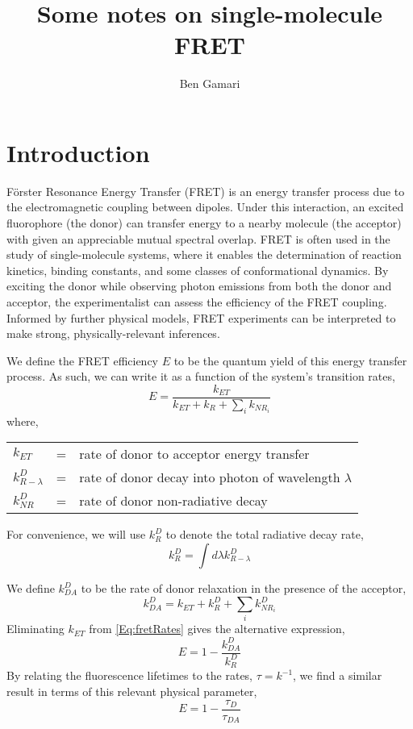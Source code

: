 \documentclass{article}
\title{Some notes on single-molecule FRET}
\author{Ben Gamari}
\newcommand{\NR}{\ensuremath{\mathit{NR}}}          %
\newcommand{\ET}{\ensuremath{\mathit{ET}}}          %
\begin{document}
\maketitle
\tableofcontents
\clearpage

\section{Introduction}
F\"orster Resonance Energy Transfer (FRET) is an energy transfer
process due to the electromagnetic coupling between dipoles. Under
this interaction, an excited fluorophore (the donor) can transfer energy
to a nearby molecule (the acceptor) with given an appreciable mutual
spectral overlap. FRET is often used in the study of single-molecule
systems, where it enables the determination of reaction kinetics,
binding constants, and some classes of conformational dynamics.
By exciting the donor while observing photon emissions from both the
donor and acceptor, the experimentalist can assess the efficiency of
the FRET coupling. Informed by further physical models, FRET
experiments can be interpreted to make strong, physically-relevant
inferences.

We define the FRET efficiency $E$ to be the quantum yield of this
energy transfer process. As such, we can write it as a function of the
system's transition rates,
\begin{equation}
  E = \frac{k_\ET}{k_\ET + k_R + \sum_i k_{\NR_i}}
  \label{Eq:fretRates}
\end{equation}
where,
\begin{tabular}{lcl}
  $k_\ET$          & = & rate of donor to acceptor energy transfer \\
  $k^D_{R-\lambda}$  & = & rate of donor decay into photon of wavelength $\lambda$ \\
  $k^D_\NR$        & = & rate of donor non-radiative decay \\
\end{tabular}
For convenience, we will use $k^D_R$ to denote the total radiative decay rate,
\[ k^D_R = \int d\lambda k^D_{R-\lambda} \]

We define $k^D_{DA}$ to be the rate of donor relaxation in the presence
of the acceptor,
\[ k^D_{DA} = k_\ET + k^D_R + \sum_i k^D_{\NR_i} \]
Eliminating $k_\ET$ from \eqref{Eq:fretRates} gives the alternative expression,
\begin{equation}
  E = 1 - \frac{k^D_{DA}}{k^D_R} \label{Eq:fretEffRates}
\end{equation}
By relating the fluorescence lifetimes to the rates, $\tau = k^{-1}$,
we find a similar result in terms of this relevant physical parameter,
\begin{equation}
  E = 1 - \frac{\tau_D}{\tau_{DA}} \label{Eq:fretEffTau}
\end{equation}
\end{document}
